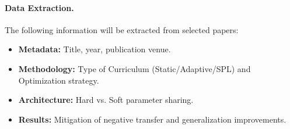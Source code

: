 \paragraph{Data Extraction.} The following information will be extracted from selected papers:
\begin{itemize}
	\item \textbf{Metadata:} Title, year, publication venue.
	\item \textbf{Methodology:} Type of Curriculum (Static/Adaptive/SPL) and Optimization strategy.
	\item \textbf{Architecture:} Hard vs. Soft parameter sharing.
	\item \textbf{Results:} Mitigation of negative transfer and generalization improvements.
\end{itemize}
